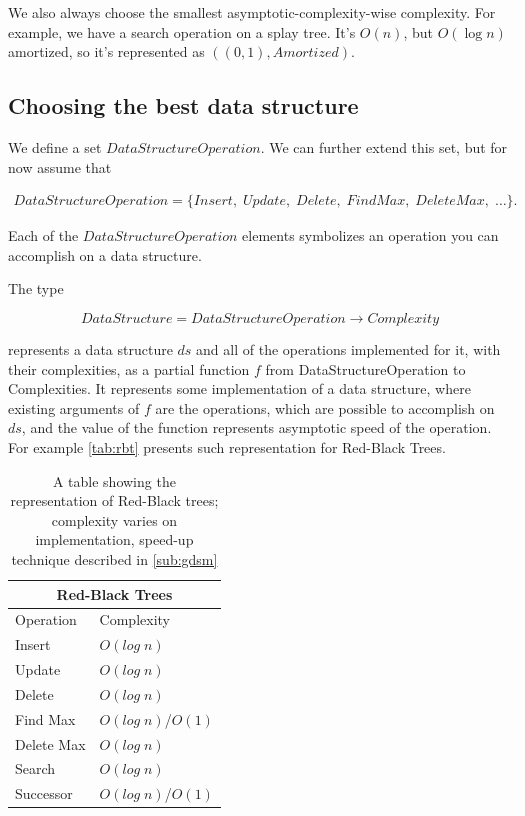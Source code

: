 \documentclass[a4paper,11pt]{article}
\begin{document}
		We also always choose the smallest asymptotic-complexity-wise complexity.  For example, we have a search
		operation on a splay tree. It's $O(n)$, but $O(\log n)$ amortized, so it's represented as
		$((0,1),Amortized)$.

	\subsection{Choosing the best data structure} \label{sec:choose-ds}

		We define a set $DataStructureOperation$. We can further extend this set, but for now assume that

		\begin{eqnarray}
			DataStructureOperation = \{Insert, \; Update, \; Delete, \; FindMax,\; DeleteMax, \; \dots\}.
		\end{eqnarray}

		Each of the $DataStructureOperation$ elements symbolizes an operation you can accomplish on a data
		structure.

		The type

		\begin{equation}\label{data-structure-type}
			DataStructure = DataStructureOperation \rightarrow Complexity
		\end{equation}

		represents a data structure $ds$ and all of the operations implemented for it, with their complexities, as a
		partial function $f$ from DataStructureOperation to Complexities. It represents some implementation of a
		data structure, where existing arguments of $f$ are the operations, which are possible to accomplish on
		$ds$, and the value of the function represents asymptotic speed of the operation. For example
		\autoref{tab:rbt} presents such representation for Red-Black Trees.

		\begin{table}[h!]
			\centering
			\begin{tabular}{|l|l|}
				\hline
				\multicolumn{2}{|c|}{Red-Black Trees} \\
				\hline
				Operation & Complexity \\
				\hline
				Insert 	        & $O(log \; n)$ \\
				Update          & $O(log \; n)$ \\
				Delete	        & $O(log \; n)$ \\
				Find Max 	& $O(log \; n)$/$O(1)$\\
				Delete Max	& $O(log \; n)$ \\
				Search 		& $O(log \; n)$ \\
				Successor 	& $O(log \; n)$/$O(1)$\\
				\hline
			\end{tabular}
			\caption{A table showing the representation of Red-Black trees; complexity varies on
			implementation, speed-up technique described in \autoref{sub:gdsm}}
			\label{tab:rbt}
		\end{table}
\end{document}
